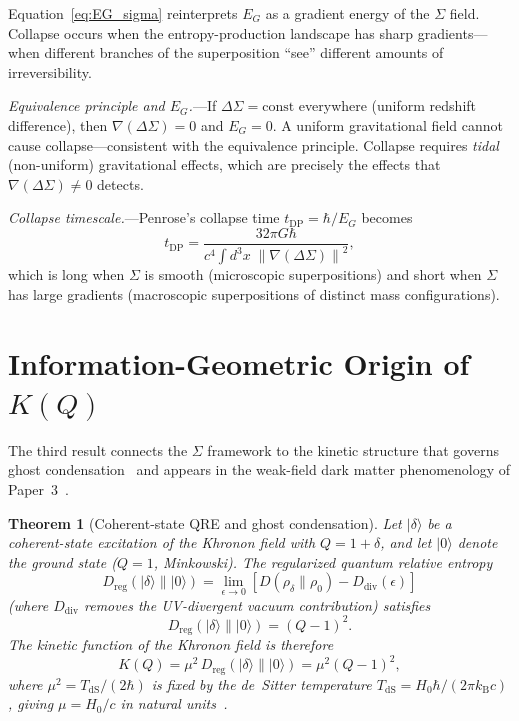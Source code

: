 \documentclass[prl,twocolumn,superscriptaddress,longbibliography,floatfix]{revtex4-2}
\newtheorem{theorem}{Theorem}
\newcommand{\kB}{k_{\mathrm{B}}}
\newcommand{\ket}[1]{|#1\rangle}
\newcommand{\norm}[1]{\left\|#1\right\|}
\begin{document}
Equation~\eqref{eq:EG_sigma} reinterprets $E_G$ as a gradient energy
of the $\Sigma$ field.  Collapse occurs when the entropy-production
landscape has sharp gradients---when different branches of the
superposition ``see'' different amounts of irreversibility.

\emph{Equivalence principle and $E_G$.}---If
$\Delta\Sigma = \mathrm{const}$ everywhere (uniform redshift
difference), then $\nabla(\Delta\Sigma) = 0$ and $E_G = 0$.  A
uniform gravitational field cannot cause collapse---consistent with
the equivalence principle.  Collapse requires
\emph{tidal} (non-uniform) gravitational effects, which are
precisely the effects that $\nabla(\Delta\Sigma) \neq 0$ detects.

\emph{Collapse timescale.}---Penrose's collapse time
$t_{\mathrm{DP}} = \hbar/E_G$ becomes
\begin{equation}
t_{\mathrm{DP}} = \frac{32\pi G\hbar}{c^4\int d^3x\;
\norm{\nabla(\Delta\Sigma)}^2},
\label{eq:t_DP}
\end{equation}
which is long when $\Sigma$ is smooth (microscopic superpositions)
and short when $\Sigma$ has large gradients (macroscopic
superpositions of distinct mass configurations).

\section{Information-Geometric Origin of \texorpdfstring{$K(Q)$}{K(Q)}}
\label{sec:KQ}

The third result connects the $\Sigma$ framework to the kinetic
structure that governs ghost condensation~\cite{ArkaniHamed2004}
and appears in the weak-field dark matter
phenomenology of Paper~3~\cite{Paper3}.

\begin{theorem}[Coherent-state QRE and ghost condensation]
\label{thm:KQ}
Let $\ket{\delta}$ be a coherent-state excitation of the Khronon
field with $Q = 1 + \delta$, and let $\ket{0}$ denote the
ground state ($Q = 1$, Minkowski).  The regularized quantum
relative entropy
\begin{equation}
D_{\mathrm{reg}}(\ket{\delta}\|\ket{0})
= \lim_{\epsilon \to 0}
\left[D(\rho_\delta\|\rho_0)
- D_{\mathrm{div}}(\epsilon)\right]
\label{eq:D_reg}
\end{equation}
(where $D_{\mathrm{div}}$ removes the UV-divergent vacuum
contribution) satisfies
\begin{equation}
\boxed{
D_{\mathrm{reg}}(\ket{\delta}\|\ket{0}) = (Q - 1)^2.
}
\label{eq:QRE_coherent}
\end{equation}
The kinetic function of the Khronon field is therefore
\begin{equation}
K(Q) = \mu^2\, D_{\mathrm{reg}}(\ket{\delta}\|\ket{0})
= \mu^2(Q-1)^2,
\label{eq:K_info}
\end{equation}
where $\mu^2 = T_{\mathrm{dS}}/(2\hbar)$ is fixed by the
de~Sitter temperature $T_{\mathrm{dS}} = H_0\hbar/(2\pi \kB c)$,
giving $\mu = H_0/c$ in natural units~\cite{Paper2,Paper3}.
\end{theorem}
\end{document}

